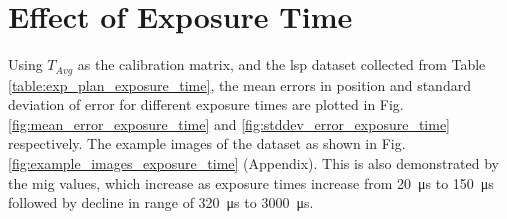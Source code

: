 


\clearpage

\section{Effect of Exposure Time} \label{section:effect_of_exp_time}
    Using $T_{Avg}$ as the calibration matrix, and the \gls{lsp} dataset collected from Table \ref{table:exp_plan_exposure_time}, the mean errors in position and standard deviation of error for different exposure times are plotted in Fig. \ref{fig:mean_error_exposure_time} and \ref{fig:stddev_error_exposure_time} respectively. The example images of the dataset as shown in Fig. \ref{fig:example_images_exposure_time} (Appendix). This is also demonstrated by the \gls{mig} values, which increase as exposure times increase from \SI{20}{\micro\second} to \SI{150}{\micro\second} followed by decline in range of \SI{320}{\micro\second} to \SI{3000}{\micro\second}. 

